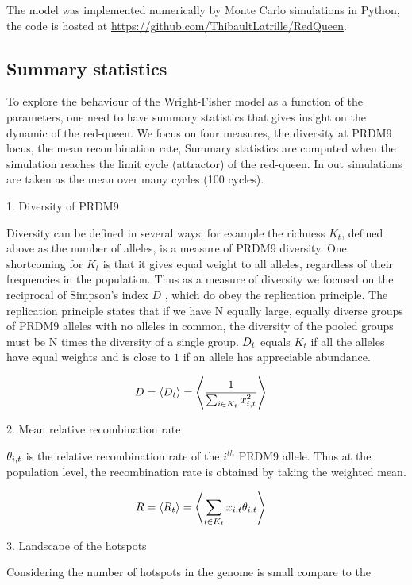 \documentclass{article}
\begin{document}
The model was implemented numerically by Monte Carlo simulations in Python, the code is hosted at \url{https://github.com/ThibaultLatrille/RedQueen}.

\subsection*{Summary statistics} 

To explore the behaviour of the Wright-Fisher model as a function of the parameters, one need to have summary statistics that gives insight on the dynamic of the red-queen. We focus on four measures, 
the diversity at PRDM9 locus, the mean recombination rate, 
Summary statistics are computed when the simulation reaches the limit cycle (attractor) of the red-queen. In out simulations are taken as the mean over many cycles (100 cycles). 

1. Diversity of PRDM9

Diversity can be defined in several ways; for example the richness $K_{t}$, defined above as the number of alleles, is a measure of PRDM9 diversity.
One shortcoming for $K_{t}$ is that it gives equal weight to all alleles, regardless of their frequencies in the population.
Thus as a measure of diversity we focused on the reciprocal of Simpson's index $D$ \cite{Hill1973}, which do obey the replication principle.
The replication principle states that if we have N equally large, equally diverse groups of PRDM9 alleles with no alleles in common, the diversity of the pooled groups must be N times the diversity of a single group.
$D_{t}$ equals $K_{t}$ if all the alleles have equal weights and is close to $1$ if an allele has appreciable abundance.

\begin{align}
     D &= \left< D_{t} \right> = \left< \dfrac{1}{\sum_{i \in K_{t}} x_{i,t}^2} \right> 
\end{align}

2. Mean relative recombination rate

$\theta _{i,t}$ is the relative recombination rate of the $i^{th}$ PRDM9 allele. Thus at the population level, the recombination rate is obtained by taking the weighted mean.

\begin{align}
    R &= \left< R_{t} \right> = \left< \sum_{i \in K_{t}} x_{i,t} \theta _{i,t} \right> 
\end{align}

3. Landscape of the hotspots

Considering the number of hotspots in the genome is small compare to the 
\end{document}
